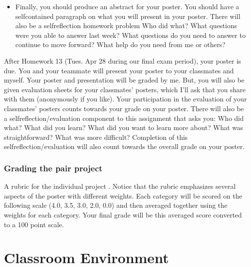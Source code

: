 \documentclass[letterpaper,10pt,english]{jupyterBook}
\begin{document}
\begin{itemize}
\item {} 
\sphinxAtStartPar
{} \sphinxhyphen{} Finally, you should produce an abstract for your poster. You should have a self\sphinxhyphen{}contained paragraph on what you will present in your poster. There will also be a self\sphinxhyphen{}reflection homework problem \sphinxhyphen{} Who did what? What questions were you able to answer last week? What questions do you need to answer to continue to move forward? What help do you need from me or others?

\end{itemize}

\sphinxAtStartPar
After Homework 13 (Tues. Apr 28 \sphinxhyphen{} during our final exam period), your poster is due. You and your teammate will present your poster to your classmates and myself. Your poster and presentation will be graded by me. But, you will also be given evaluation sheets for your classmates’ posters, which I’ll ask that you share with them (anonymously if you like). Your participation in the evaluation of your classmates’ posters counts towards your grade on your poster. There will also be a self\sphinxhyphen{}reflection/evaluation component to this assignment that asks you: Who did what? What did you learn? What did you want to learn more about? What was straight\sphinxhyphen{}forward? What was more difficult? Completion of this self\sphinxhyphen{}reflection/evaluation will also count towards the overall grade on your poster.


\subsubsection{Grading the pair project}
\label{\detokenize{content/0_course/assessments:grading-the-pair-project}}
\sphinxAtStartPar
A rubric for the individual project . Notice that the rubric emphasizes several aspects of the poster with different weights. Each category will be scored on the following scale (4.0, 3.5, 3.0, 2.0, 0.0) and then averaged together using the weights for each category. Your final grade will be this averaged score converted to a 100 point scale.


\section{Classroom Environment}
\label{\detokenize{content/0_course/environment:classroom-environment}}\label{\detokenize{content/0_course/environment::doc}}
\end{document}
